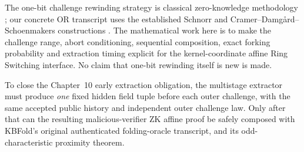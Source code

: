 \begin{remark}
The one-bit challenge rewinding
strategy is classical
zero-knowledge methodology
\cite{Goldreich2001Foundations};
our concrete OR transcript
uses the established Schnorr and
Cramer--Damg{\aa}rd--Schoenmakers
constructions
\cite{Schnorr1991,CramerDamgardSchoenmakers1994}.
The mathematical work here is to
make the challenge range, abort
conditioning, sequential
composition, exact forking
probability and extraction
timing explicit for the
kernel-coordinate affine
Ring Switching interface.
No claim that one-bit rewinding
itself is new is made.
\end{remark}

\begin{remark}
To close the Chapter~10 early
extraction obligation, the
multistage extractor must produce
\emph{one} fixed hidden field
tuple before each outer challenge,
with the same accepted public
history and independent outer
challenge law. Only after that
can the resulting malicious-verifier
ZK affine proof be safely
composed with KBFold's original
authenticated folding-oracle
transcript, and its odd-
characteristic proximity theorem.
\end{remark}
